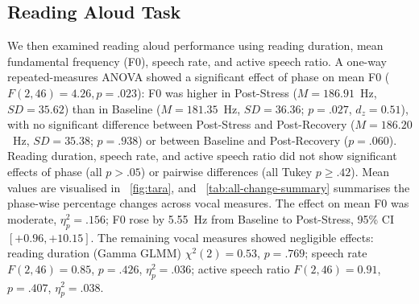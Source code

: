 \subsection{Reading Aloud Task}
We then examined reading aloud performance using reading duration, mean fundamental frequency (F0), speech rate, and active speech ratio. A one-way repeated-measures ANOVA showed a significant effect of phase on mean F0 ($F(2,46)=4.26, p=.023$): F0 was higher in Post-Stress ($M=186.91$~Hz, $SD=35.62$) than in Baseline ($M=181.35$~Hz, $SD=36.36$; $p=.027$, $d_z=0.51$), with no significant difference between Post-Stress and Post-Recovery ($M=186.20$~Hz, $SD=35.38$; $p=.938$) or between Baseline and Post-Recovery ($p=.060$). Reading duration, speech rate, and active speech ratio did not show significant effects of phase (all $p>.05$) or pairwise differences (all Tukey $p \geq .42$). Mean values are visualised in ~\autoref{fig:tara}, and ~\autoref{tab:all-change-summary} summarises the phase-wise percentage changes across vocal measures. The effect on mean F0 was moderate, $\eta_p^2=.156$; F0 rose by 5.55~Hz from Baseline to Post-Stress, 95\% CI $[+0.96, +10.15]$. The remaining vocal measures showed negligible effects: reading duration (Gamma GLMM) $\chi^2(2)=0.53$, $p=.769$; speech rate $F(2,46)=0.85$, $p=.426$, $\eta_p^2=.036$; active speech ratio $F(2,46)=0.91$, $p=.407$, $\eta_p^2=.038$.

